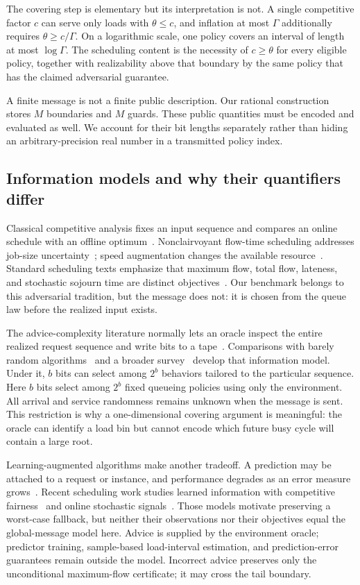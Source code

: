 The covering step is elementary but its interpretation is not. A single competitive factor $c$ can serve only loads with $\theta\leq c$, and inflation at most $\Gamma$ additionally requires $\theta\geq c/\Gamma$. On a logarithmic scale, one policy covers an interval of length at most $\log\Gamma$. The scheduling content is the necessity of $c\geq\theta$ for every eligible policy, together with realizability above that boundary by the same policy that has the claimed adversarial guarantee.

A finite message is not a finite public description. Our rational construction stores $M$ boundaries and $M$ guards. These public quantities must be encoded and evaluated as well. We account for their bit lengths separately rather than hiding an arbitrary-precision real number in a transmitted policy index.

\subsection{Information models and why their quantifiers differ}
Classical competitive analysis fixes an input sequence and compares an online schedule with an offline optimum~\cite{borodin1998,albers2003}. Nonclairvoyant flow-time scheduling addresses job-size uncertainty~\cite{kalyan1997,kalyan2003,becchetti2004}; speed augmentation changes the available resource~\cite{kalyan2000}. Standard scheduling texts emphasize that maximum flow, total flow, lateness, and stochastic sojourn time are distinct objectives~\cite{pinedo2016,lenstra2020}. Our benchmark belongs to this adversarial tradition, but the message does not: it is chosen from the queue law before the realized input exists.

The advice-complexity literature normally lets an oracle inspect the entire realized request sequence and write bits to a tape~\cite{bocken2009,hromkovic2010,emek2011}. Comparisons with barely random algorithms~\cite{komm2011} and a broader survey~\cite{boyar2016} develop that information model. Under it, $b$ bits can select among $2^b$ behaviors tailored to the particular sequence. Here $b$ bits select among $2^b$ fixed queueing policies using only the environment. All arrival and service randomness remains unknown when the message is sent. This restriction is why a one-dimensional covering argument is meaningful: the oracle can identify a load bin but cannot encode which future busy cycle will contain a large root.

Learning-augmented algorithms make another tradeoff. A prediction may be attached to a request or instance, and performance degrades as an error measure grows~\cite{lykouris2018,purohit2018,mitzenmacher2022}. Recent scheduling work studies learned information with competitive fairness~\cite{li2025} and online stochastic signals~\cite{cosson2026}. Those models motivate preserving a worst-case fallback, but neither their observations nor their objectives equal the global-message model here. Advice is supplied by the environment oracle; predictor training, sample-based load-interval estimation, and prediction-error guarantees remain outside the model. Incorrect advice preserves only the unconditional maximum-flow certificate; it may cross the tail boundary.

